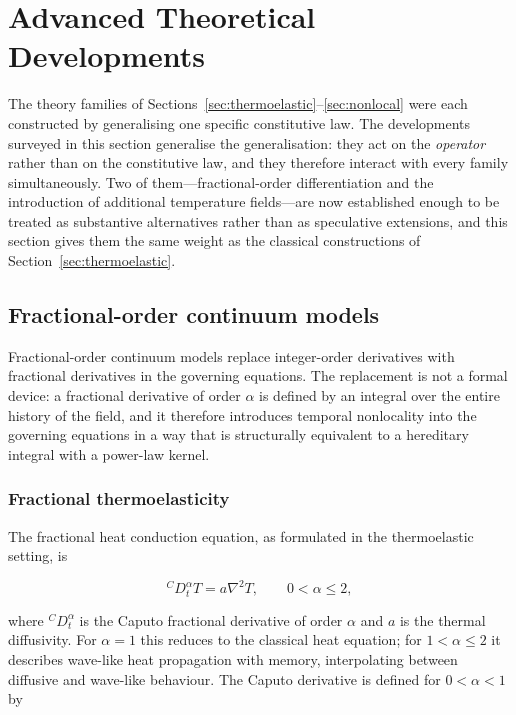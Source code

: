 \section{Advanced Theoretical Developments}
\label{sec:advanced}

The theory families of Sections~\ref{sec:thermoelastic}--\ref{sec:nonlocal} were each constructed by generalising one specific constitutive law. The developments surveyed in this section generalise the generalisation: they act on the \emph{operator} rather than on the constitutive law, and they therefore interact with every family simultaneously. Two of them---fractional-order differentiation and the introduction of additional temperature fields---are now established enough to be treated as substantive alternatives rather than as speculative extensions, and this section gives them the same weight as the classical constructions of Section~\ref{sec:thermoelastic}.

\subsection{Fractional-order continuum models}
\label{sec:11.1}

Fractional-order continuum models replace integer-order derivatives with fractional derivatives in the governing equations. The replacement is not a formal device: a fractional derivative of order $\alpha$ is defined by an integral over the entire history of the field, and it therefore introduces temporal nonlocality into the governing equations in a way that is structurally equivalent to a hereditary integral with a power-law kernel.

\subsubsection{Fractional thermoelasticity}

The fractional heat conduction equation, as formulated in the thermoelastic setting, is

\begin{equation}
{}^C D_t^\alpha T = a\nabla^2 T, \qquad 0 < \alpha \leq 2,
\label{eq:11.1}
\end{equation}

where ${}^C D_t^\alpha$ is the Caputo fractional derivative of order $\alpha$ and $a$ is the thermal diffusivity. For $\alpha = 1$ this reduces to the classical heat equation; for $1 < \alpha \leq 2$ it describes wave-like heat propagation with memory, interpolating between diffusive and wave-like behaviour. The Caputo derivative is defined for $0 < \alpha < 1$ by

